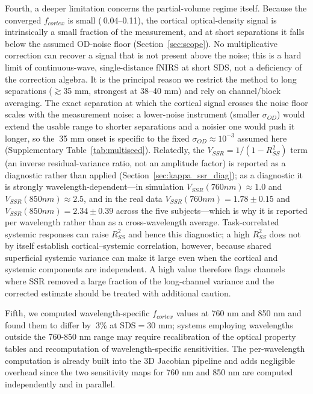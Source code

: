 \documentclass[11pt]{article}
\def\sim{~}%
\def\mathrm#1{#1}%
\def\,{ }%
\begin{document}
Fourth, a deeper limitation concerns the partial-volume regime itself. Because the converged $f_{\mathrm{cortex}}$ is small ($\sim$0.04--0.11), the cortical optical-density signal is intrinsically a small fraction of the measurement, and at short separations it falls below the assumed OD-noise floor (Section~\ref{sec:scope}). No multiplicative correction can recover a signal that is not present above the noise; this is a hard limit of continuous-wave, single-distance fNIRS at short SDS, not a deficiency of the correction algebra. It is the principal reason we restrict the method to long separations ($\gtrsim$35\,mm, strongest at 38--40\,mm) and rely on channel/block averaging. The exact separation at which the cortical signal crosses the noise floor scales with the measurement noise: a lower-noise instrument (smaller $\sigma_{\mathrm{OD}}$) would extend the usable range to shorter separations and a noisier one would push it longer, so the $\sim$35\,mm onset is specific to the fixed $\sigma_{\mathrm{OD}}\approx10^{-3}$ assumed here (Supplementary Table~\ref{tab:multiseed}). Relatedly, the $V_{\mathrm{SSR}}=1/(1-R^2_{\mathrm{SS}})$ term (an inverse residual-variance ratio, not an amplitude factor) is reported as a diagnostic rather than applied (Section~\ref{sec:kappa_ssr_diag}); as a diagnostic it is strongly wavelength-dependent---in simulation $V_{\mathrm{SSR}}(760\,\mathrm{nm})\approx1.0$ and $V_{\mathrm{SSR}}(850\,\mathrm{nm})\approx2.5$, and in the real data $V_{\mathrm{SSR}}(760\,\mathrm{nm})=1.78\pm0.15$ and $V_{\mathrm{SSR}}(850\,\mathrm{nm})=2.34\pm0.39$ across the five subjects---which is why it is reported per wavelength rather than as a cross-wavelength average. Task-correlated systemic responses\cite{r8,r17} can raise $R^2_{\mathrm{SS}}$ and hence this diagnostic; a high $R^2_{\mathrm{SS}}$ does not by itself establish cortical--systemic correlation, however, because shared superficial systemic variance can make it large even when the cortical and systemic components are independent. A high value therefore flags channels where SSR removed a large fraction of the long-channel variance and the corrected estimate should be treated with additional caution.

Fifth, we computed wavelength-specific $f_{\mathrm{cortex}}$ values at 760\,nm and 850\,nm and found them to differ by $\sim$3\% at SDS$\,=\,$30\,mm; systems employing wavelengths outside the 760-850\,nm range may require recalibration of the optical property tables and recomputation of wavelength-specific sensitivities. The per-wavelength computation is already built into the 3D Jacobian pipeline and adds negligible overhead since the two sensitivity maps for 760\,nm and 850\,nm are computed independently and in parallel.
\end{document}
